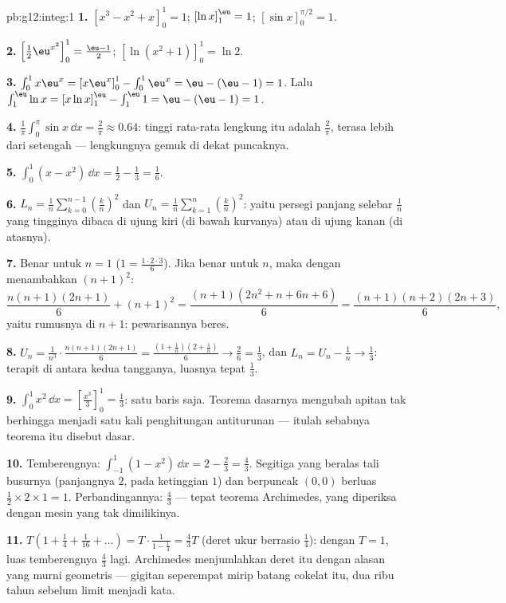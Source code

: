 \begin{solution}{pb:g12:integ:1}
\textbf{1.} $\left[x^3 - x^2 + x\right]_0^1 = 1$; \quad
$\left[\ln x\right]_1^{\eu} = 1$; \quad
$\left[\sin x\right]_0^{\pi/2} = 1$.

\textbf{2.} $\left[\frac12 \eu^{x^2}\right]_0^1 =
\frac{\eu - 1}{2}$; \quad
$\left[\ln(x^2 + 1)\right]_0^1 = \ln 2$.

\textbf{3.} $\int_0^1 x\eu^x = \left[x\eu^x\right]_0^1 -
\int_0^1 \eu^x = \eu - (\eu - 1) = 1$. Lalu
$\int_1^{\eu} \ln x = \left[x\ln x\right]_1^{\eu} -
\int_1^{\eu} 1 = \eu - (\eu - 1) = 1$.

\textbf{4.} $\frac{1}{\pi}\int_0^\pi \sin x\,\dd x =
\frac{2}{\pi} \approx 0.64$: tinggi rata-rata lengkung 
itu adalah $\frac2\pi$, terasa lebih dari setengah --- lengkungnya
gemuk di dekat puncaknya.

\textbf{5.} $\int_0^1 (x - x^2)\,\dd x = \frac12 - \frac13 =
\frac16$.

\textbf{6.} $L_n = \frac1n \sum_{k=0}^{n-1}
\left(\frac kn\right)^2$ dan
$U_n = \frac1n \sum_{k=1}^{n} \left(\frac kn\right)^2$: yaitu
persegi panjang selebar $\frac1n$ yang tingginya dibaca di ujung kiri
(di bawah kurvanya) atau di ujung kanan (di atasnya).

\textbf{7.} Benar untuk $n = 1$ ($1 = \frac{1 \cdot 2 \cdot
3}{6}$). Jika benar untuk $n$, maka dengan menambahkan $(n+1)^2$:
\[
\frac{n(n+1)(2n+1)}{6} + (n+1)^2
= \frac{(n+1)\left(2n^2 + n + 6n + 6\right)}{6}
= \frac{(n+1)(n+2)(2n+3)}{6},
\]
yaitu rumusnya di $n + 1$: pewarisannya beres.

\textbf{8.} $U_n = \frac{1}{n^3} \cdot
\frac{n(n+1)(2n+1)}{6} = \frac{(1 + \frac1n)(2 + \frac1n)}{6}
\to \frac26 = \frac13$, dan $L_n = U_n - \frac1n \to \frac13$:
terapit di antara kedua tangganya, luasnya tepat
$\frac13$.

\textbf{9.} $\int_0^1 x^2\,\dd x =
\left[\frac{x^3}{3}\right]_0^1 = \frac13$: satu baris saja. Teorema
dasarnya mengubah apitan tak berhingga menjadi satu kali
penghitungan antiturunan --- itulah sebabnya teorema itu disebut
dasar.

\textbf{10.} Temberengnya: $\int_{-1}^{1}(1 - x^2)\,\dd x =
2 - \frac23 = \frac43$. Segitiga yang beralas tali busurnya (panjangnya
$2$, pada ketinggian $1$) dan berpuncak $(0,0)$ berluas
$\frac12 \times 2 \times 1 = 1$. Perbandingannya: $\frac43$ --- tepat
teorema Archimedes, yang diperiksa dengan mesin yang tak dimilikinya.

\textbf{11.} $T\left(1 + \frac14 + \frac{1}{16} + \dots\right)
= T \cdot \frac{1}{1 - \frac14} = \frac43 T$ (deret ukur
berrasio $\frac14$): dengan $T = 1$, luas temberengnya
$\frac43$ lagi. Archimedes menjumlahkan deret itu dengan alasan yang
murni geometris --- gigitan seperempat mirip batang cokelat
itu, dua ribu tahun sebelum limit menjadi kata.


\end{solution}
